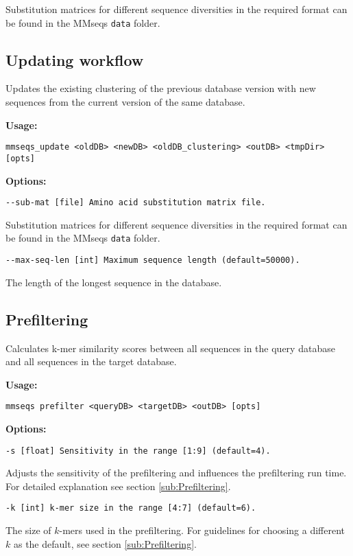 \documentclass[11pt,a4paper]{report}
\begin{document}
Substitution matrices for different sequence diversities in the required
format can be found in the MMseqs \texttt{data} folder.


\subsection{Updating workflow}

Updates the existing clustering of the previous database version with
new sequences from the current version of the same database.

\textbf{Usage:}

\texttt{mmseqs\_update <oldDB> <newDB> <oldDB\_clustering> <outDB>
<tmpDir> {[}opts{]}}

\textbf{Options:}

\texttt{\small -{}-sub-mat {[}file{]} Amino acid substitution matrix
file.}{\small \par}

Substitution matrices for different sequence diversities in the required
format can be found in the MMseqs \texttt{data} folder.

\texttt{\small -{}-max-seq-len {[}int{]} Maximum sequence length (default=50000).}{\small \par}

The length of the longest sequence in the database.


\subsection{Prefiltering}

Calculates k-mer similarity scores between all sequences in the query
database and all sequences in the target database.

\textbf{Usage:}

\texttt{mmseqs prefilter <queryDB> <targetDB> <outDB> {[}opts{]}}

\textbf{Options:}

\texttt{\small -s {[}float{]} Sensitivity in the range {[}1:9{]} (default=4).}{\small \par}

Adjusts the sensitivity of the prefiltering and influences the prefiltering
run time. For detailed explanation see section \ref{sub:Prefiltering}.

\texttt{\small -k {[}int{]} k-mer size in the range {[}4:7{]} (default=6).}{\small \par}

The size of $k$-mers used in the prefiltering. For guidelines for
choosing a different $k$ as the default, see section \ref{sub:Prefiltering}.
\end{document}
